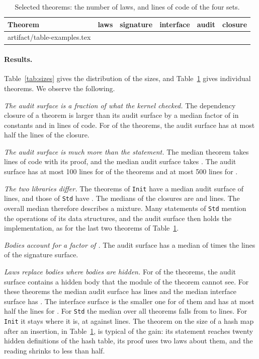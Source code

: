 \documentclass[acmsmall,nonacm,screen]{acmart}
\makeatletter
\newcommand{\lean}[1]{\texttt{#1}}
\newcommand{\rows}[1]{\@@input #1 }
\makeatother
\begin{document}
\begin{table}
\caption{Selected theorems: the number of laws, and lines of code of the four sets.}
\label{tab:examples}
\begin{tabular}{lrrrrr}
\toprule
Theorem & laws & signature & interface & audit & closure \\
\midrule
\rows{artifact/table-examples.tex}
\bottomrule
\end{tabular}
\end{table}

\paragraph{Results.}
Table~\ref{tab:sizes} gives the distribution of the sizes, and Table~\ref{tab:examples} gives
individual theorems. We observe the following.

\emph{The audit surface is a fraction of what the kernel checked.} The dependency closure of a
theorem is larger than its audit surface by a median factor of \RatioClosureAuditConsts{} in
constants and \RatioClosureAuditLines{} in lines of code. For \NumAuditHalf{} of the
\NumSample{} theorems, the audit surface has at most half the lines of the closure.

\emph{The audit surface is much more than the statement.} The median theorem takes
\OwnLinesMedian{} lines of code with its proof, and the median audit surface takes
\AuditLinesMedian{}. The audit surface has at most 100 lines for \NumAuditAtMostHundred{} of the
theorems and at most 500 lines for \NumAuditAtMostFiveHundred{}.

\emph{The two libraries differ.} The theorems of \lean{Init} have a median audit surface of
\InitAuditLinesMedian{} lines, and those of \lean{Std} have \StdAuditLinesMedian{}. The medians
of the closures are \InitClosureLinesMedian{} and \StdClosureLinesMedian{} lines. The overall
median therefore describes a mixture. Many statements of \lean{Std} mention the operations of
its data structures, and the audit surface then holds the implementation, as for the last two
theorems of Table~\ref{tab:examples}.

\emph{Bodies account for a factor of \RatioAuditSigLines{}.} The audit surface has a median of
\RatioAuditSigLines{} times the lines of the signature surface.

\emph{Laws replace bodies where bodies are hidden.} For \NumWithSubjects{} of the \NumSample{}
theorems, the audit surface contains a hidden body that the module of the theorem cannot see.
For these theorems the median audit surface has \SubjAuditLinesMedian{} lines and the median
interface surface has \SubjIfaceLinesMedian{}. The interface surface is the smaller one for
\NumIfaceSmaller{} of them and has at most half the lines for \NumIfaceHalf{}. For \lean{Std}
the median over all theorems falls from \StdAuditLinesMedian{} to \StdIfaceLinesMedian{} lines.
For \lean{Init} it stays where it is, at \InitIfaceLinesMedian{} against \InitAuditLinesMedian{}
lines. The theorem on the size of a hash map after an insertion, in
Table~\ref{tab:examples}, is typical of the gain: its statement reaches twenty hidden
definitions of the hash table, its proof uses two laws about them, and the reading shrinks to
less than half.
\end{document}
